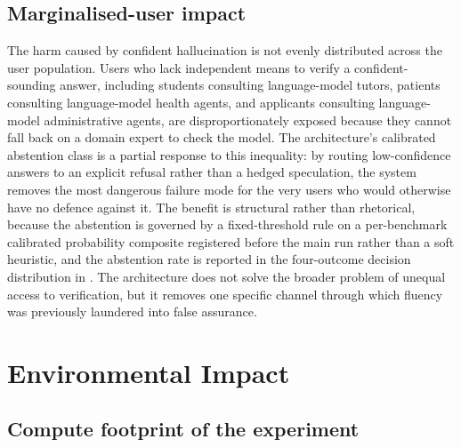 \subsection{Marginalised-user impact}
\label{sec:soc-marginalised}

The harm caused by confident hallucination is not evenly distributed across the user population. Users who lack independent means to verify a confident-sounding answer, including students consulting language-model tutors, patients consulting language-model health agents, and applicants consulting language-model administrative agents, are disproportionately exposed because they cannot fall back on a domain expert to check the model. The architecture's calibrated abstention class is a partial response to this inequality: by routing low-confidence answers to an explicit refusal rather than a hedged speculation, the system removes the most dangerous failure mode for the very users who would otherwise have no defence against it. The benefit is structural rather than rhetorical, because the abstention is governed by a fixed-threshold rule on a per-benchmark calibrated probability composite registered before the main run rather than a soft heuristic, and the abstention rate is reported in the four-outcome decision distribution in . The architecture does not solve the broader problem of unequal access to verification, but it removes one specific channel through which fluency was previously laundered into false assurance.

\section{Environmental Impact}
\label{sec:environment}

\subsection{Compute footprint of the experiment}
\label{sec:env-experiment}

